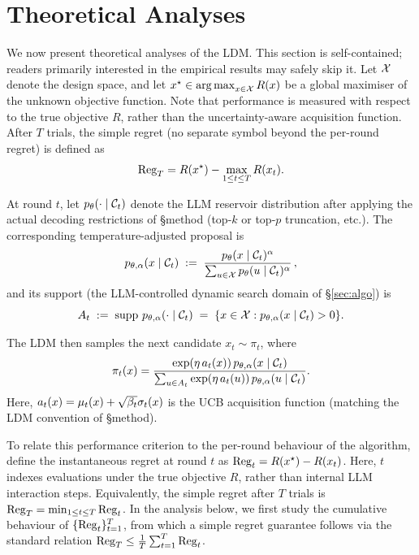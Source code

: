 \section{Theoretical Analyses}
\label{sec:theory-main}

We now present theoretical analyses of the LDM. This section is self-contained; readers primarily interested in the empirical results may safely skip it. Let \(\mathcal{X}\) denote the design space, and let \(x^\star \in \operatorname*{arg\,max}_{x \in \mathcal{X}} R(x)\) be a global maximiser of the unknown objective function. 
Note that performance is measured with respect to the true objective \(R\), rather than the uncertainty-aware acquisition function. After \(T\) trials, the simple regret (no separate symbol beyond the per-round regret) is defined as
\begin{equation}
\mathrm{Reg}_T = R(x^\star) - \max_{1 \le t \le T} R(x_t).
\end{equation}

At round \(t\), let \(p_\theta(\cdot\mid\mathcal{C}_t)\) denote the LLM reservoir distribution after applying the actual decoding restrictions of §method (top-\(k\) or top-\(p\) truncation, etc.). The corresponding temperature-adjusted proposal is
\[
p_{\theta,\alpha}(x\mid\mathcal{C}_t) \;:=\;
\frac{p_\theta(x\mid\mathcal{C}_t)^\alpha}
{\sum_{u \in \mathcal{X}} p_\theta(u\mid\mathcal{C}_t)^\alpha}\,,
\]
and its support (the LLM-controlled dynamic search domain of §\ref{sec:algo}) is
\[
A_t \;:=\; \operatorname{supp}\, p_{\theta,\alpha}(\cdot\mid\mathcal{C}_t) \;=\; \{x\in\mathcal{X} : p_{\theta,\alpha}(x\mid\mathcal{C}_t) > 0\}.
\]

The LDM then samples the next candidate \(x_t \sim \pi_t\), where
\begin{equation}
\label{eq:theory-pi}
\pi_t(x) =
\frac{\exp(\eta\,a_t(x))\,p_{\theta,\alpha}(x\mid\mathcal{C}_t)}
{\sum_{u \in A_t} \exp(\eta\,a_t(u))\,p_{\theta,\alpha}(u\mid\mathcal{C}_t)}.
\end{equation}
Here, $a_t(x) = \mu_t(x) + \sqrt{\beta_t}\sigma_t(x)$ is the UCB acquisition function (matching the LDM convention of §method).

To relate this performance criterion to the per-round behaviour of the algorithm, define the instantaneous regret at round \(t\) as $\mathrm{Reg}_t = R(x^\star) - R(x_t)$. Here, \(t\) indexes evaluations under the true objective \(R\), rather than internal LLM interaction steps. Equivalently, the simple regret after \(T\) trials is $\mathrm{Reg}_T = \min_{1 \le t \le T} \mathrm{Reg}_t$. In the analysis below, we first study the cumulative behaviour of \(\{\mathrm{Reg}_t\}_{t=1}^T\), from which a simple regret guarantee follows via the standard relation $\mathrm{Reg}_T \le \frac{1}{T}\sum_{t=1}^T \mathrm{Reg}_t$.

